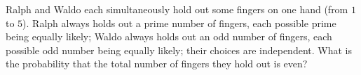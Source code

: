 Ralph and Waldo each simultaneously hold out some fingers on one hand (from $1$ to $5$). Ralph always holds out a prime number of fingers, each possible prime being equally likely; Waldo always holds out an odd number of fingers, each possible odd number being equally likely; their choices are independent. What is the probability that the total number of fingers they hold out is even?
